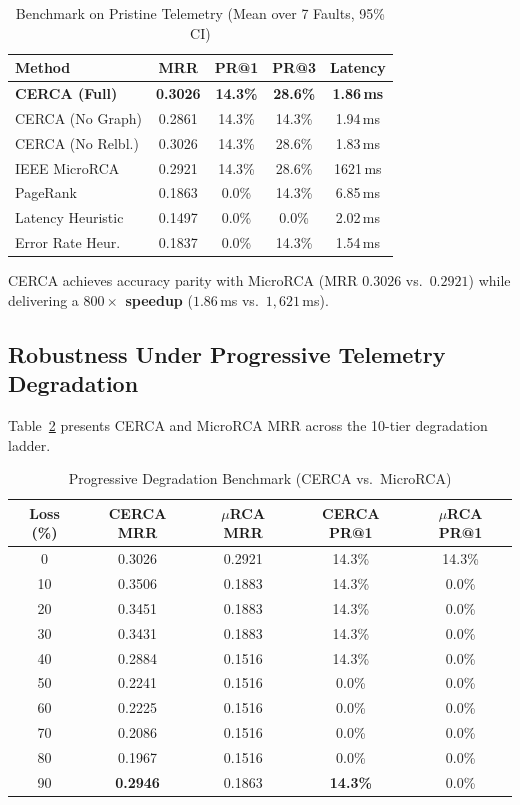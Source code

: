 \documentclass[conference]{IEEEtran}
\begin{document}
\begin{table}[htbp]
\caption{Benchmark on Pristine Telemetry (Mean over 7 Faults, 95\% CI)}
\label{tab:pristine}
\begin{tabular}{lcccc}
\toprule
\textbf{Method} & \textbf{MRR} & \textbf{PR@1} & \textbf{PR@3} & \textbf{Latency} \\
\midrule
\textbf{CERCA (Full)} & \textbf{0.3026} & \textbf{14.3\%} & \textbf{28.6\%} & \textbf{1.86\,ms} \\
CERCA (No Graph) & 0.2861 & 14.3\% & 14.3\% & 1.94\,ms \\
CERCA (No Relbl.) & 0.3026 & 14.3\% & 28.6\% & 1.83\,ms \\
IEEE MicroRCA \cite{wu2020} & 0.2921 & 14.3\% & 28.6\% & 1621\,ms \\
PageRank & 0.1863 & 0.0\% & 14.3\% & 6.85\,ms \\
Latency Heuristic & 0.1497 & 0.0\% & 0.0\% & 2.02\,ms \\
Error Rate Heur. & 0.1837 & 0.0\% & 14.3\% & 1.54\,ms \\
\bottomrule
\end{tabular}
\end{table}

CERCA achieves accuracy parity with MicroRCA (MRR $0.3026$ vs.\ $0.2921$) while delivering a \textbf{$800\times$ speedup} ($1.86$\,ms vs.\ $1{,}621$\,ms).

\subsection{Robustness Under Progressive Telemetry Degradation}

Table~\ref{tab:degradation} presents CERCA and MicroRCA MRR across the 10-tier degradation ladder.

\begin{table}[htbp]
\caption{Progressive Degradation Benchmark (CERCA vs.\ MicroRCA)}
\label{tab:degradation}
\begin{tabular}{ccccc}
\toprule
\textbf{Loss (\%)} & \textbf{CERCA MRR} & \textbf{$\mu$RCA MRR} & \textbf{CERCA PR@1} & \textbf{$\mu$RCA PR@1} \\
\midrule
0  & 0.3026 & 0.2921 & 14.3\% & 14.3\% \\
10 & 0.3506 & 0.1883 & 14.3\% & 0.0\% \\
20 & 0.3451 & 0.1883 & 14.3\% & 0.0\% \\
30 & 0.3431 & 0.1883 & 14.3\% & 0.0\% \\
40 & 0.2884 & 0.1516 & 14.3\% & 0.0\% \\
50 & 0.2241 & 0.1516 & 0.0\% & 0.0\% \\
60 & 0.2225 & 0.1516 & 0.0\% & 0.0\% \\
70 & 0.2086 & 0.1516 & 0.0\% & 0.0\% \\
80 & 0.1967 & 0.1516 & 0.0\% & 0.0\% \\
90 & \textbf{0.2946} & 0.1863 & \textbf{14.3\%} & 0.0\% \\
\bottomrule
\end{tabular}
\end{table}
\end{document}
